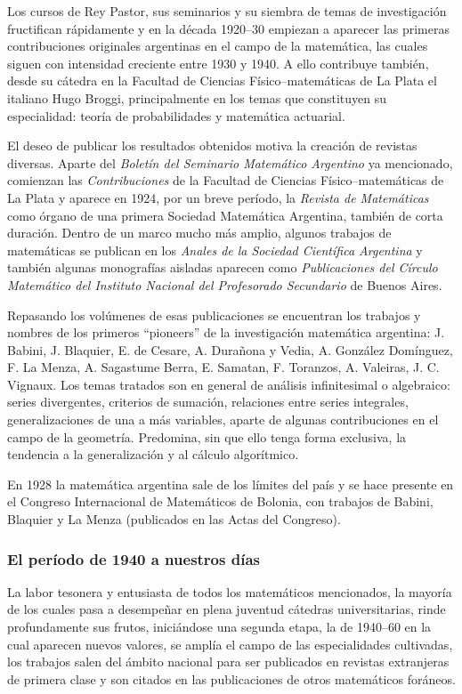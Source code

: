 Los cursos de Rey Pastor, sus seminarios y su siembra de temas de investigación
fructifican rápidamente y en la década 1920--30 empiezan a aparecer las
primeras contribuciones originales argentinas en el campo de la matemática, las
cuales siguen con intensidad creciente entre 1930 y 1940. A ello contribuye
también, desde su cátedra en la Facultad de Ciencias Físico--matemáticas de La
Plata el italiano Hugo Broggi, principalmente en los temas que constituyen su
especialidad: teoría de probabilidades y matemática actuarial. 

El deseo de publicar los resultados obtenidos motiva la creación de revistas
diversas. Aparte del \emph{Boletín del Seminario Matemático Argentino} ya
mencionado, comienzan las \emph{Contribuciones} de la Facultad de Ciencias
Físico--matemáticas de La Plata y aparece en 1924, por un breve período, la
\emph{Revista de Matemáticas} como órgano de una primera Sociedad Matemática
Argentina, también de corta duración. Dentro de un marco mucho más amplio,
algunos trabajos de matemáticas se publican en los \emph{Anales de la Sociedad
Científica Argentina} y también algunas monografías aisladas aparecen como
\emph{Publicaciones del Círculo Matemático del Instituto Nacional del
Profesorado Secundario} de Buenos Aires.

Repasando los volúmenes de esas publicaciones se encuentran los trabajos y
nombres de los primeros ``pioneers'' de la investigación matemática argentina:
J. Babini, J. Blaquier, E. de Cesare, A. Durañona y Vedia, A. González
Domínguez, F. La Menza, A. Sagastume Berra, E. Samatan, F. Toranzos, A.
Valeiras, J. C. Vignaux. Los temas tratados son en general de análisis
infinitesimal o algebraico: series divergentes, criterios de sumación,
relaciones entre series integrales, generalizaciones de una a más variables,
aparte de algunas contribuciones en el campo de la geometría. Predomina, sin
que ello tenga forma exclusiva, la tendencia a la generalización y al cálculo
algorítmico. 

En 1928 la matemática argentina sale de los límites del país y se hace presente
en el Congreso Internacional de Matemáticos de Bolonia, con trabajos de Babini,
Blaquier y La Menza (publicados en las Actas del Congreso).

\subsubsection*{El período de 1940 a nuestros días}

La labor tesonera y entusiasta de todos los matemáticos mencionados, la mayoría
de los cuales pasa a desempeñar en plena juventud cátedras universitarias,
rinde profundamente sus frutos, iniciándose una segunda etapa, la de 1940--60
en la cual aparecen nuevos valores, se amplía el campo de las especialidades
cultivadas, los trabajos salen del ámbito nacional para ser publicados en
revistas extranjeras de primera clase y son citados en las publicaciones de
otros matemáticos foráneos. 


